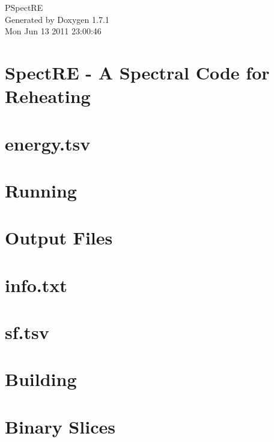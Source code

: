 \documentclass[letterpaper]{book}
\begin{document}
\hypersetup{pageanchor=false}
\begin{titlepage}
\vspace*{7cm}
\begin{center}
{\Large PSpectRE }\\
\vspace*{1cm}
{\large Generated by Doxygen 1.7.1}\\
\vspace*{0.5cm}
{\small Mon Jun 13 2011 23:00:46}\\
\end{center}
\end{titlepage}
\clearemptydoublepage
{}
\tableofcontents
\clearemptydoublepage
{}
\hypersetup{pageanchor=true}
\chapter{SpectRE -\/ A Spectral Code for Reheating}
\label{index}\hypertarget{index}{}
\chapter{energy.tsv}
\label{energy_tsv}
\hypertarget{energy_tsv}{}

\chapter{Running}
\label{running}
\hypertarget{running}{}

\chapter{Output Files}
\label{outputs}
\hypertarget{outputs}{}

\chapter{info.txt}
\label{info_txt}
\hypertarget{info_txt}{}

\chapter{sf.tsv}
\label{sf_tsv}
\hypertarget{sf_tsv}{}

\chapter{Building}
\label{building}
\hypertarget{building}{}

\chapter{Binary Slices}
\label{slices}
\hypertarget{slices}{}

\end{document}
